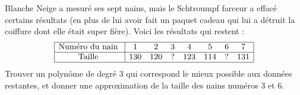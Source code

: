 \begin{exercice}\label{exotestMAT1151-G320003}

	Blanche Neige a mesuré ses sept nains, mais le Schtroumpf farceur a effacé certains résultats (en plus de lui avoir fait un paquet cadeau qui lui a détruit la coiffure dont elle était super fière). Voici les résultats qui restent :
	\begin{equation}
		\begin{array}{|c|ccccccc|}
			\hline
			\text{Numéro du nain } & 1 & 2 & 3 & 4 & 5 & 6 & 7  \\
			\hline
			\text{Taille } & 130 & 120 & ? & 123 & 114 & ? & 131 \\
			\hline
		\end{array}
	\end{equation}
	Trouver un polynôme de degré $3$ qui correspond le mieux possible aux données restantes, et donner une approximation de la taille des nains numéros $3$ et $6$.

\end{exercice}
